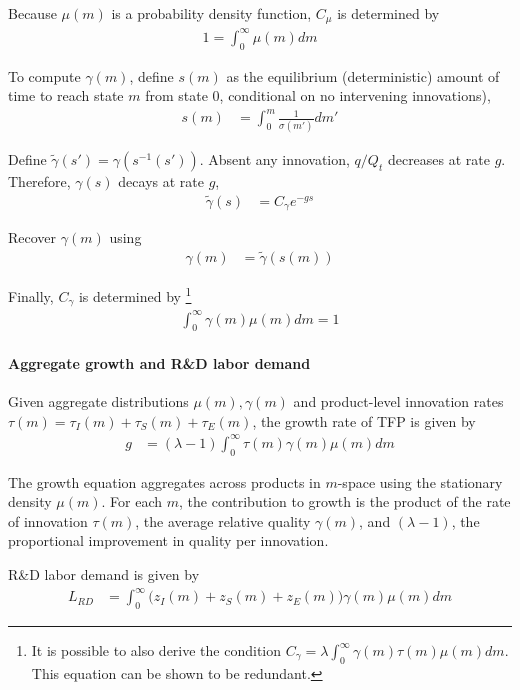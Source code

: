 \documentclass[12pt,english]{article}
\theoremstyle{remark}
\begin{document}
Because $\mu(m)$ is a probability density function, $C_\mu$ is determined by
\begin{align}
	1 = \int_0^{\infty} \mu(m) dm \label{KF_solution_2}
\end{align}

To compute $\gamma(m)$, define $s(m)$ as the equilibrium (deterministic) amount of time to reach state $m$ from state $0$, conditional on no intervening innovations), 
\begin{align}
	s(m) &= \int_0^m \frac{1}{\sigma(m')} dm'
\end{align}

Define $\tilde{\gamma}(s') = \gamma(s^{-1}(s'))$. Absent any innovation, $q/Q_t$ decreases at rate $g$. Therefore, $\gamma(s)$ decays at rate $g$, 
\begin{align}
	\tilde{\gamma}(s) &= C_{\gamma} e^{-gs}
\end{align}

Recover $\gamma(m)$ using 
\begin{align}
	\gamma(m) &= \tilde{\gamma}(s(m))
\end{align}

Finally, $C_{\gamma}$ is determined by \footnote{It is possible to also derive the condition $C_{\gamma} = \lambda \int_0^{\infty} \gamma(m) \tau(m) \mu(m) dm$. This equation can be shown to be redundant.}
\begin{align}
	\int_0^{\infty} \gamma(m) \mu(m) dm = 1
\end{align}

\paragraph{Aggregate growth and R\&D labor demand}

Given aggregate distributions $\mu(m),\gamma(m)$ and product-level innovation rates $\tau(m) = \tau_I(m) + \tau_S(m) + \tau_E(m)$, the growth rate of TFP is given by
\begin{align}
	g &= (\lambda -1) \int_0^{\infty} \tau(m) \gamma(m) \mu(m) dm 
\end{align}

The growth equation aggregates across products in $m$-space using the stationary density $\mu(m)$. For each $m$, the contribution to growth is the product of the rate of innovation $\tau(m)$, the average relative quality $\gamma(m)$, and $(\lambda -1)$, the proportional improvement in quality per innovation.

R\&D labor demand is given by 
\begin{align*}
	L_{RD} &= \int_0^{\infty} \big (z_I(m) + z_S(m) + z_E(m)\big)\gamma(m)\mu(m) dm
\end{align*}
\end{document}
